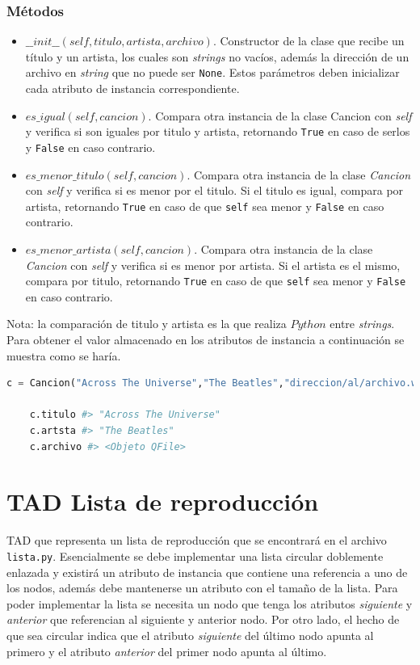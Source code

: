 \documentclass[10pt, letterpaper]{article}
\begin{document}
\subsubsection*{Métodos}
\begin{itemize}
    \item $\_\_init\_\_(self,titulo,artista,archivo)$. Constructor de la clase que recibe un título y un artista, los cuales son \textit{strings} no vacíos, además la dirección de un archivo en \textit{string} que no puede ser \texttt{None}. Estos parámetros deben inicializar cada atributo de instancia correspondiente.
    \item $es\_igual(self,cancion)$. Compara otra instancia de la clase Cancion con \textit{self} y verifica si son iguales por titulo y artista, retornando \texttt{True} en caso de serlos y \texttt{False} en caso contrario.
    \item $es\_menor\_titulo(self,cancion)$. Compara otra instancia de la clase \textit{Cancion} con \textit{self} y verifica si es menor por el titulo. Si el titulo es igual, compara por artista, retornando \texttt{True} en caso de que \texttt{self} sea menor y \texttt{False} en caso contrario.
    \item $es\_menor\_artista(self,cancion)$. Compara otra instancia de la clase \textit{Cancion} con \textit{self} y verifica si es menor por artista. Si el artista es el mismo, compara por titulo, retornando \texttt{True} en caso de que \texttt{self} sea menor y \texttt{False} en caso contrario.
\end{itemize}

Nota: la comparación de titulo y artista es la que realiza $Python$ entre \textit{strings}.
\\

Para obtener el valor almacenado en los atributos de instancia a continuación se muestra como se haría.

\begin{center}
\begin{lstlisting}[language=Python,frame=single]
    c = Cancion("Across The Universe","The Beatles","direccion/al/archivo.wav")
    
    c.titulo #> "Across The Universe"
    c.artsta #> "The Beatles"
    c.archivo #> <Objeto QFile>
\end{lstlisting}
\end{center}

\section*{TAD Lista de reproducción}
TAD que representa un lista de reproducción que se encontrará en el archivo \texttt{lista.py}. Esencialmente se debe implementar una lista circular doblemente enlazada \cite{cormen} y existirá un atributo de instancia que contiene una referencia a uno de los nodos, además debe mantenerse un atributo con el tamaño de la lista. Para poder implementar la lista se necesita un nodo que tenga los atributos \textit{siguiente} y \textit{anterior} que referencian al siguiente y anterior nodo. Por otro lado, el hecho de que sea circular indica que el atributo \textit{siguiente} del último nodo apunta al primero y el atributo \textit{anterior} del primer nodo apunta al último.
\end{document}
